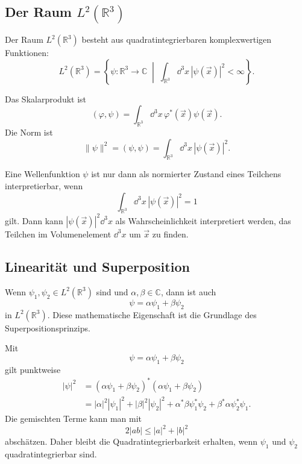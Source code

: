 \subsection{Der Raum $L^2(\mathbb{R}^3)$}

\begin{definitionbox}
Der Raum $L^2(\mathbb{R}^3)$ besteht aus quadratintegrierbaren komplexwertigen Funktionen:
\[
    L^2(\mathbb{R}^3)=
    \left\{
    \psi:\mathbb{R}^3\to\mathbb{C}
    \;\middle|\;
    \int_{\mathbb{R}^3}\dd^3x\, |\psi(\vec x)|^2<\infty
    \right\}.
\]
\end{definitionbox}

Das Skalarprodukt ist
\[
    (\varphi,\psi)=\int_{\mathbb{R}^3}\dd^3x\,\varphi^*(\vec x)\psi(\vec x).
\]
Die Norm ist
\[
    \|\psi\|^2=(\psi,\psi)=\int_{\mathbb{R}^3}\dd^3x\,|\psi(\vec x)|^2.
\]

\begin{conceptbox}
Eine Wellenfunktion $\psi$ ist nur dann als normierter Zustand eines Teilchens interpretierbar, wenn
\[
    \int_{\mathbb{R}^3}\dd^3x\,|\psi(\vec x)|^2=1
\]
gilt. Dann kann $|\psi(\vec x)|^2\dd^3x$ als Wahrscheinlichkeit interpretiert werden, das Teilchen im Volumenelement $\dd^3x$ um $\vec x$ zu finden.
\end{conceptbox}

\subsection{Linearität und Superposition}

Wenn $\psi_1,\psi_2\in L^2(\mathbb{R}^3)$ sind und $\alpha,\beta\in\mathbb{C}$, dann ist auch
\[
    \psi=\alpha\psi_1+\beta\psi_2
\]
in $L^2(\mathbb{R}^3)$. Diese mathematische Eigenschaft ist die Grundlage des Superpositionsprinzips.

\begin{derivationbox}
Mit
\[
    \psi=\alpha\psi_1+\beta\psi_2
\]
gilt punktweise
\[
\begin{aligned}
|\psi|^2
&=(\alpha\psi_1+\beta\psi_2)^*(\alpha\psi_1+\beta\psi_2)\\
&=|\alpha|^2|\psi_1|^2+|\beta|^2|\psi_2|^2
+\alpha^*\beta\psi_1^*\psi_2+\beta^*\alpha\psi_2^*\psi_1.
\end{aligned}
\]
Die gemischten Terme kann man mit
\[
    2|ab|\le |a|^2+|b|^2
\]
abschätzen. Daher bleibt die Quadratintegrierbarkeit erhalten, wenn $\psi_1$ und $\psi_2$ quadratintegrierbar sind.
\end{derivationbox}


